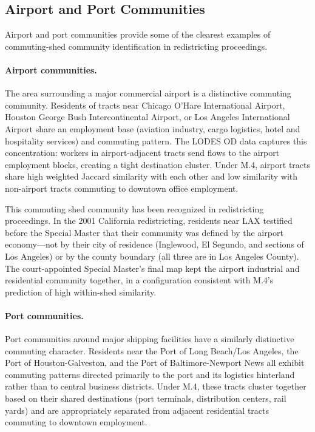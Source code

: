 \subsection{Airport and Port Communities}

Airport and port communities provide some of the clearest examples of
commuting-shed community identification in redistricting proceedings.

\paragraph{Airport communities.}
The area surrounding a major commercial airport is a distinctive commuting
community.
Residents of tracts near Chicago O'Hare International Airport, Houston
George Bush Intercontinental Airport, or Los Angeles International Airport
share an employment base (aviation industry, cargo logistics, hotel and
hospitality services) and commuting pattern.
The LODES OD data captures this concentration: workers in airport-adjacent
tracts send flows to the airport employment blocks, creating a tight
destination cluster.
Under M.4, airport tracts share high weighted Jaccard similarity with each
other and low similarity with non-airport tracts commuting to downtown office
employment.

This commuting shed community has been recognized in redistricting proceedings.
In the 2001 California redistricting, residents near LAX testified before
the Special Master that their community was defined by the airport economy---not
by their city of residence (Inglewood, El Segundo, and sections of Los Angeles)
or by the county boundary (all three are in Los Angeles County).
The court-appointed Special Master's final map kept the airport industrial and
residential community together, in a configuration consistent with M.4's
prediction of high within-shed similarity.

\paragraph{Port communities.}
Port communities around major shipping facilities have a similarly distinctive
commuting character.
Residents near the Port of Long Beach/Los Angeles, the Port of Houston-Galveston,
and the Port of Baltimore-Newport News all exhibit commuting patterns directed
primarily to the port and its logistics hinterland rather than to central
business districts.
Under M.4, these tracts cluster together based on their shared destinations
(port terminals, distribution centers, rail yards) and are appropriately
separated from adjacent residential tracts commuting to downtown employment.

